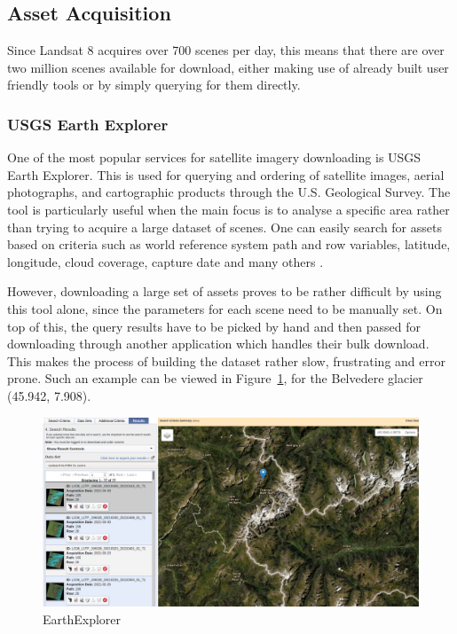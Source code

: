 \documentclass[12pt, a4paper]{report}
\begin{document}
	\subsection{Asset Acquisition}
	
	\par Since Landsat 8 acquires over 700 scenes per day, this means that there are over two million scenes available for download, either making use of already built user friendly tools or by simply querying for them directly.
	
	\subsubsection{USGS Earth Explorer}
	
	\par One of the most popular services for satellite imagery downloading is USGS Earth Explorer. This is used for querying and ordering of satellite images, aerial photographs, and cartographic products through the U.S. Geological Survey. The tool is particularly useful when the main focus is to analyse a specific area rather than trying to acquire a large dataset of scenes. One can easily search for assets based on criteria such as world reference system path and row variables, latitude, longitude, cloud coverage, capture date and many others \cite{USGS}.
	
	\par However, downloading a large set of assets proves to be rather difficult by using this tool alone, since the parameters for each scene need to be manually set. On top of this, the query results have to be picked by hand and then passed for downloading through another application which handles their bulk download. This makes the process of building the dataset rather slow, frustrating and error prone. Such an example can be viewed in Figure~\ref{fig:EarthExplorer}, for the Belvedere glacier (45.942, 7.908).
	
	\begin{figure}[h]
		\centering
		\includegraphics[scale=0.25]{../images/EarthExplorer.png}
		\caption{EarthExplorer}
		\label{fig:EarthExplorer}
	\end{figure}
	
\end{document}
